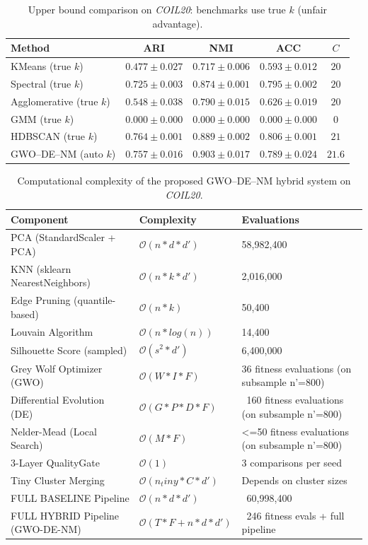 \begin{table}[htbp]
\centering\small
\caption{Upper bound comparison on \textit{COIL20}: benchmarks use true $k$ (unfair advantage).}
\label{tab:upper_coil20}
\begin{tabular}{lcccc}
\toprule
Method & ARI & NMI & ACC & $C$ \\
\midrule
KMeans (true $k$) & $0.477 \pm 0.027$ & $0.717 \pm 0.006$ & $0.593 \pm 0.012$ & $20$ \\
Spectral (true $k$) & $0.725 \pm 0.003$ & $0.874 \pm 0.001$ & $0.795 \pm 0.002$ & $20$ \\
Agglomerative (true $k$) & $0.548 \pm 0.038$ & $0.790 \pm 0.015$ & $0.626 \pm 0.019$ & $20$ \\
GMM (true $k$) & $0.000 \pm 0.000$ & $0.000 \pm 0.000$ & $0.000 \pm 0.000$ & $0$ \\
HDBSCAN (true $k$) & $0.764 \pm 0.001$ & $0.889 \pm 0.002$ & $0.806 \pm 0.001$ & $21$ \\
\midrule
GWO--DE--NM (auto $k$) & $\mathbf{0.757 \pm 0.016}$ & $\mathbf{0.903 \pm 0.017}$ & $\mathbf{0.789 \pm 0.024}$ & $21.6$ \\
\bottomrule
\end{tabular}
\end{table}

\begin{table}[htbp]
\centering
\small
\caption{Computational complexity of the proposed GWO--DE--NM hybrid system on \textit{COIL20}.}
\label{tab:complexity_coil20}
\begin{tabular}{lll}
\toprule
Component & Complexity & Evaluations \\
\midrule
PCA (StandardScaler + PCA) & $\mathcal{O}(n * d * d')$ & 58,982,400 \\
KNN (sklearn NearestNeighbors) & $\mathcal{O}(n * k * d')$ & 2,016,000 \\
Edge Pruning (quantile-based) & $\mathcal{O}(n * k)$ & 50,400 \\
Louvain Algorithm & $\mathcal{O}(n * log(n))$ & 14,400 \\
Silhouette Score (sampled) & $\mathcal{O}(s^2 * d')$ & 6,400,000 \\
Grey Wolf Optimizer (GWO) & $\mathcal{O}(W * I * F)$ & 36 fitness evaluations (on subsample n'=800) \\
Differential Evolution (DE) & $\mathcal{O}(G * P * D * F)$ & ~160 fitness evaluations (on subsample n'=800) \\
Nelder-Mead (Local Search) & $\mathcal{O}(M * F)$ & <=50 fitness evaluations (on subsample n'=800) \\
3-Layer QualityGate & $\mathcal{O}(1)$ & 3 comparisons per seed \\
Tiny Cluster Merging & $\mathcal{O}(n_tiny * C * d')$ & Depends on cluster sizes \\
\midrule
FULL BASELINE Pipeline & $\mathcal{O}(n * d * d')$ & ~60,998,400 \\
\midrule
FULL HYBRID Pipeline (GWO-DE-NM) & $\mathcal{O}(T * F + n * d * d')$ & ~246 fitness evals + full pipeline \\
\bottomrule
\end{tabular}
\end{table}